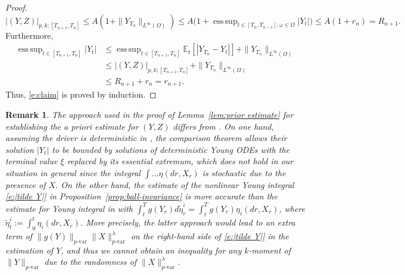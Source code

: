 \documentclass[11pt,reqno]{amsart}
\newtheorem{remark}{Remark}[section]
\DeclareMathOperator*{\esssup}{ess\,sup}
\numberwithin{equation}{section}
\begin{document}
\begin{proof}
\begin{equation*}
\left|(Y,Z)\right|_{p,k;[T_{n+1},T_{n}]}\le A(1+\|Y_{T_n}\|_{L^{\infty}(\Omega)})\le A\Big(1+\esssup_{t\in[T_{n},T_{n-1}];\omega\in\Omega}|Y_{t}|\Big) \le A (1 + r_{n}) = R_{n+1}.
\end{equation*}
Furthermore, 
\begin{equation*}
\begin{aligned}
\esssup_{t\in[T_{n+1},T_{n}]}\left|Y_{t}\right|&\le \esssup_{t\in[T_{n+1},T_{n}]}\mathbb{E}_{t}\left[|Y_{T_{n}} - Y_{t}|\right] + \|Y_{T_{n}}\|_{L^{\infty}(\Omega)}\\
& \le \left|(Y,Z)\right|_{p,k;[T_{n+1},T_{n}]} + \|Y_{T_{n}}\|_{L^{\infty}(\Omega)} \\
& \le R_{n+1} + r_{n} = r_{n+1}.
\end{aligned}
\end{equation*}
Thus, \eqref{e:claim} is proved by induction. 	
\end{proof}

\begin{remark}\label{rem:differ from DZ}
The approach used in the proof of  Lemma~\ref{lem:prior estimate} for establishing the \emph{a priori} estimate for  $(Y,Z)$  differs from \cite[p.~10]{DiehlZhang}. On one hand, assuming the driver is deterministic in \cite{DiehlZhang}, the comparison theorem allows their  solution $|Y_t|$ to be bounded by solutions of \emph{deterministic} Young ODEs with the terminal value $\xi$ replaced by its essential extremum, which does not hold in our situation in general since  the integral $\int \dots \eta(dr,X_r)$ is stochastic due to the presence of $X$. On the other hand, the estimate of the nonlinear Young integral \eqref{e:|tilde Y|} in Proposition~\ref{prop:ball-invariance} is more accurate than the estimate for Young integral in \cite[Theorem 5]{DiehlZhang} with $\int_{t}^{T} g(Y_r) d\tilde{\eta}^{i}_r = \int_{t}^{T} g(Y_r) \eta_{i}(dr,X_r)$, where $\tilde{\eta}^{i}_{t} := \int_{0}^{t} \eta_i(dr,X_r)$. More precisely,
the latter approach would lead to an extra term of $\|g(Y)\|_{p\text{-}\mathrm{var}}\|X\|^{\lambda}_{p\text{-}\mathrm{var}}$ on the right-hand side of  \eqref{e:|tilde Y|} in the estimation of $Y$, and thus we cannot obtain an inequality for any $k$-moment of $\|Y\|_{p\text{-var}}$ due to the randomness of $\|X\|^{\lambda}_{p\text{-}\mathrm{var}}$.
\end{remark}
\end{document}
